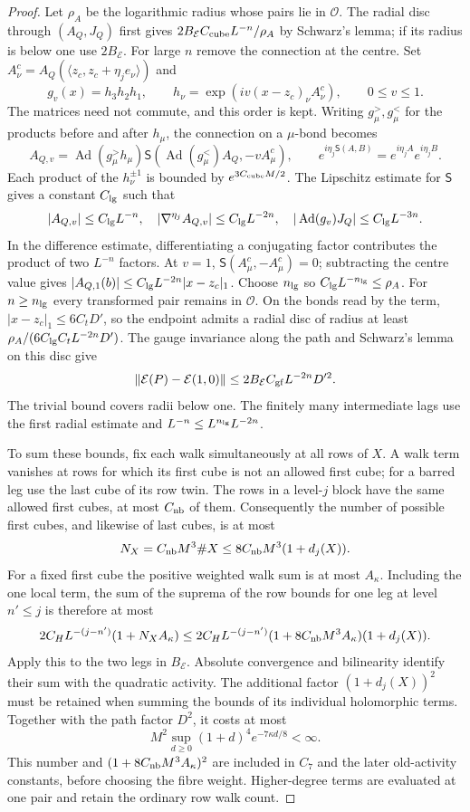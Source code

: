 \documentclass[11pt,letterpaper,reqno]{amsart}
\theoremstyle{definition}
\theoremstyle{remark}
\begin{document}
\begin{proof}
Let $\rho_A$ be the logarithmic radius whose pairs lie in
$\mathcal O$.  The radial disc through $(A_Q,J_Q)$ first
gives $2B_{\mathcal E}C_{\rm cube}L^{-n}/\rho_A$ by
Schwarz's lemma; if its radius is below one use
$2B_{\mathcal E}$.  For large $n$ remove the connection
at the centre.  Set
$A^c_\nu=A_Q(\langle z_c,z_c+\eta_je_\nu\rangle)$ and
\[
 g_v(x)=h_3h_2h_1,\qquad
 h_\nu=\exp(iv(x-z_c)_\nu A^c_\nu),\qquad0\le v\le1.
\]
The matrices need not commute, and this order is kept.
Writing $g^>_\mu,g^<_\mu$ for the products before and
after $h_\mu$, the connection on a $\mu$-bond becomes
\[
 A_{Q,v}=\operatorname{Ad}(g^>_\mu h_\mu)
 \mathsf S(\operatorname{Ad}(g^<_\mu)A_Q,-vA^c_\mu),
 \qquad e^{i\eta_j\mathsf S(A,B)}=e^{i\eta_jA}e^{i\eta_jB}.
\]
Each product of the $h_\nu^{\pm1}$ is bounded by
$e^{3C_{\rm cube}M/2}$.  The Lipschitz estimate for
$\mathsf S$ gives a constant $C_{\rm lg}$ such that
\[
 |A_{Q,v}|\le C_{\rm lg}L^{-n},\quad
 |\nabla^{\eta_j}A_{Q,v}|\le C_{\rm lg}L^{-2n},\quad
 |\operatorname{Ad}(g_v)J_Q|\le C_{\rm lg}L^{-3n}.
\]
In the difference estimate, differentiating a conjugating
factor contributes the product of two $L^{-n}$ factors.
At $v=1$, $\mathsf S(A^c_\mu,-A^c_\mu)=0$; subtracting
the centre value gives
$|A_{Q,1}(b)|\le C_{\rm lg}L^{-2n}|x-z_c|_1$.
Choose $n_{\rm lg}$ so
$C_{\rm lg}L^{-n_{\rm lg}}\le\rho_A$.
For $n\ge n_{\rm lg}$ every transformed pair remains
in $\mathcal O$.  On the bonds read by the term,
$|x-z_c|_1\le6C_tD'$, so the endpoint admits a radial
disc of radius at least
$\rho_A/(6C_{\rm lg}C_tL^{-2n}D')$.
The gauge invariance along the path and Schwarz's lemma
on this disc give
\[
 \|\mathcal E(P)-\mathcal E(1,0)\|
       \le2B_{\mathcal E}C_{\rm gf}L^{-2n}D'^2.
\]
The trivial bound covers radii below one.  The finitely
many intermediate lags use the first radial estimate
and $L^{-n}\le L^{n_{\rm lg}}L^{-2n}$.

To sum these bounds, fix each walk simultaneously at all rows of
$X$. A walk term vanishes at rows for which its first cube is
not an allowed first cube; for a barred leg use the last cube
of its row twin. The rows in a level-$j$ block have the same
allowed first cubes, at most $C_{\rm nb}$ of them. Consequently
the number of possible first cubes, and likewise of last cubes,
is at most
\[
 N_X=C_{\rm nb}M^3\#X
       \le8C_{\rm nb}M^3(1+d_j(X)).
\]
For a fixed first cube the positive weighted walk sum is at
most $A_\kappa$. Including the one local term, the sum of the
suprema of the row bounds for one leg at level $n'\le j$ is
therefore at most
\[
 2C_HL^{-(j-n')}(1+N_XA_\kappa)
 \le2C_HL^{-(j-n')}(1+8C_{\rm nb}M^3A_\kappa)(1+d_j(X)).
\]
Apply this to the two legs in $B_{\mathcal E}$. Absolute
convergence and bilinearity identify their sum with the
quadratic activity. The additional factor $(1+d_j(X))^2$
must be retained when summing the bounds of its individual
holomorphic terms. Together with the path factor $D^2$, it
costs at most
\[
 M^2\sup_{d\ge0}(1+d)^4e^{-7\kappa d/8}<\infty.
\]
This number and $(1+8C_{\rm nb}M^3A_\kappa)^2$ are included
in $C_7$ and the later old-activity constants, before choosing
the fibre weight. Higher-degree terms are evaluated at one
pair and retain the ordinary row walk count.


\end{proof}
\end{document}
